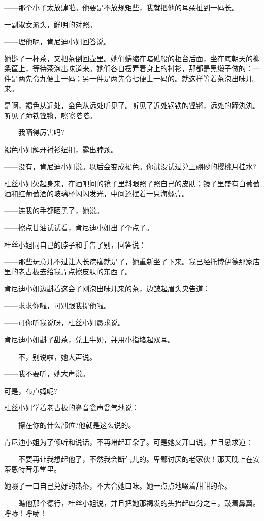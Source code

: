 \par ——那个小子太放肆啦。他要是不放规矩些，我就把他的耳朵扯到一码长。
\par 一副淑女派头，鲜明的对照。
\par ——理他呢，肯尼迪小姐回答说。
\par 她斟了一杯茶，又把茶倒回壶里。她们蜷缩在暗礁般的柜台后面，坐在底朝天的柳条筐上，等待茶泡出味道来。她们各自摆弄着身上的衬衫，那都是黑缎子做的：一件是两先令九便士一码；另一件是两先令七便士一码的。就这样等着茶泡出味儿来。
\par 是啊，褐色从近处，金色从远处听见了。听见了近处钢铁的铿锵，远处的蹄汍汍。听见了蹄铁铿锵，嚓嚓嗒嗒。
\par ——我晒得厉害吗?
\par 褐色小姐解开衬衫纽扣，露出脖颈。
\par ——没有，肯尼迪小姐说。以后会变成褐色。你试没试过兑上硼砂的樱桃月桂水?
\par 杜丝小姐欠起身来，在酒吧间的镜子里斜眼照了照自己的皮肤；镜子里盛有白葡萄酒和红葡萄酒的玻璃杯闪闪发光，中间还摆着一只海螺壳。
\par ——连我的手都晒黑了，她说。
\par ——擦点甘油试试看，肯尼迪小姐出了个点子。
\par 杜丝小姐同自己的脖子和手告了别，回答说：
\par ——那些玩意儿不过让人长疙瘩就是了，她重新坐了下来。我已经托博伊德那家店里的老古板去给我弄点擦皮肤的东西了。
\par 肯尼迪小姐边斟着这会子刚泡出味儿来的茶，边皱起眉头央告道：
\par ——求求你啦，可别跟我提他啦。
\par ——可你听我说呀，杜丝小姐恳求说。
\par 肯尼迪小姐斟了甜茶，兑上牛奶，并用小指堵起双耳。
\par ——不，别说啦，她大声说。
\par ——我不要听，她大声说。
\par 可是，布卢姆呢?
\par 杜丝小姐学着老古板的鼻音瓮声瓮气地说：
\par ——擦在你的什么部位?他就是这么说的。
\par 肯尼迪小姐为了倾听和说话，不再堵起耳朵了。可是她又开口说，并且恳求道：
\par ——不要再让我想起他了，不然我会断气儿的。卑鄙讨厌的老家伙！那天晚上在安蒂恩特音乐堂里。
\par 她啜了一口自己兑好的热茶，不大合她口味。她一点点地啜着甜甜的茶。
\par ——瞧他那个德行，杜丝小姐说，并且把她那褐发的头抬起四分之三，鼓着鼻翼。呼哧！呼哧！
